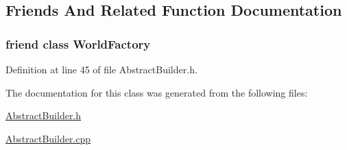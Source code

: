 \subsection{Friends And Related Function Documentation}
\hypertarget{classjli_1_1_abstract_builder_acb96ebb09abe8f2a37a915a842babfac}{
\subsubsection[{World\+Factory}]{\setlength{\rightskip}{0pt plus 5cm}friend class {\bf World\+Factory}\hspace{0.3cm}{\ttfamily [friend]}}}\label{classjli_1_1_abstract_builder_acb96ebb09abe8f2a37a915a842babfac}


Definition at line 45 of file Abstract\+Builder.\+h.



The documentation for this class was generated from the following files\+:\begin{DoxyCompactItemize}
\item 
\hyperlink{_abstract_builder_8h}{Abstract\+Builder.\+h}\item 
\hyperlink{_abstract_builder_8cpp}{Abstract\+Builder.\+cpp}\end{DoxyCompactItemize}
